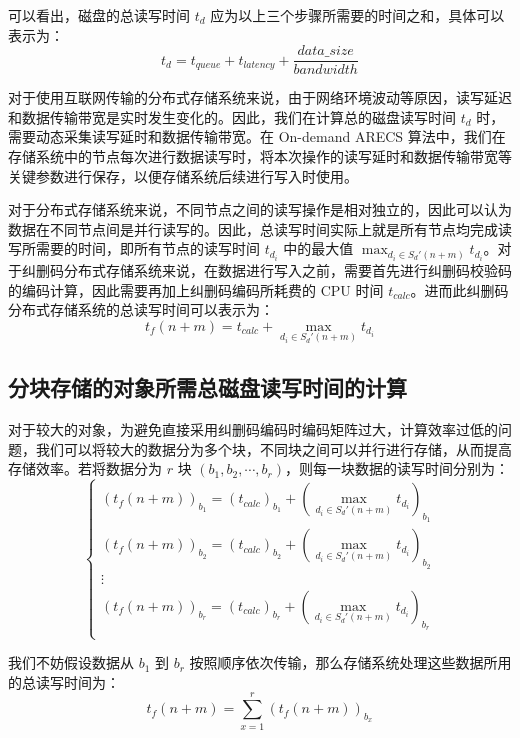 可以看出，磁盘的总读写时间 $t_{d}$ 应为以上三个步骤所需要的时间之和，具体可以表示为：
\begin{equation}
t_{d}=t_{queue}+t_{latency}+\dfrac{data\_size}{bandwidth}
\end{equation}

对于使用互联网传输的分布式存储系统来说，由于网络环境波动等原因，读写延迟和数据传输带宽是实时发生变化的。因此，我们在计算总的磁盘读写时间 $t_{d}$ 时，需要动态采集读写延时和数据传输带宽。在 On-demand ARECS 算法中，我们在存储系统中的节点每次进行数据读写时，将本次操作的读写延时和数据传输带宽等关键参数进行保存，以便存储系统后续进行写入时使用。

对于分布式存储系统来说，不同节点之间的读写操作是相对独立的，因此可以认为数据在不同节点间是并行读写的。因此，总读写时间实际上就是所有节点均完成读写所需要的时间，即所有节点的读写时间 $t_{d_i}$ 中的最大值 $\displaystyle\max_{d_{i}{\in}S_{d}'(n+m)}t_{d_i}$。对于纠删码分布式存储系统来说，在数据进行写入之前，需要首先进行纠删码校验码的编码计算，因此需要再加上纠删码编码所耗费的 CPU 时间 $t_{calc}$。进而此纠删码分布式存储系统的总读写时间可以表示为：
\begin{equation}
t_{f}(n+m)=t_{calc}+\max_{d_{i}{\in}S_{d}'(n+m)}t_{d_i}
\end{equation}
\subsection{分块存储的对象所需总磁盘读写时间的计算}
对于较大的对象，为避免直接采用纠删码编码时编码矩阵过大，计算效率过低的问题，我们可以将较大的数据分为多个块，不同块之间可以并行进行存储，从而提高存储效率。若将数据分为 $r$ 块 $(b_{1},b_{2},\cdots,b_{r})$，则每一块数据的读写时间分别为：
\begin{equation}
\begin{cases}
\left(t_{f}(n+m)\right)_{b_{1}}=(t_{calc})_{b_{1}}+\left(\displaystyle\max_{d_{i}{\in}S_{d}'(n+m)}t_{d_i}\right)_{b_{1}}\\
\left(t_{f}(n+m)\right)_{b_{2}}=(t_{calc})_{b_{2}}+\left(\displaystyle\max_{d_{i}{\in}S_{d}'(n+m)}t_{d_i}\right)_{b_{2}}\\
\vdots\\
\left(t_{f}(n+m)\right)_{b_{r}}=(t_{calc})_{b_{r}}+\left(\displaystyle\max_{d_{i}{\in}S_{d}'(n+m)}t_{d_i}\right)_{b_{r}}\\
\end{cases}
\end{equation}

我们不妨假设数据从 $b_{1}$ 到 $b_{r}$ 按照顺序依次传输，那么存储系统处理这些数据所用的总读写时间为：
\begin{equation}
t_{f}(n+m)=\sum_{x=1}^{r}\left(t_{f}(n+m)\right)_{b_{x}}
\end{equation}


